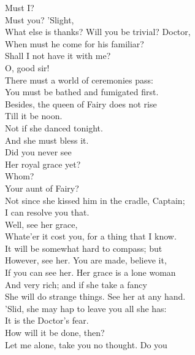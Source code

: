 \documentclass[a4paper,oneside,12pt]{memoir}
\begin{document}
\begin{drama*}
\dapperspeaks {} Must I?\\
\facespeaks {} Must you? 'Slight,\\
What else is thanks? Will you be trivial? Doctor,\\
When must he come for his familiar?\\
\dapperspeaks Shall I not have it with me?\\
\subtlespeaks {} O, good sir!\\
There must a world of ceremonies pass:\\
You must be bathed and fumigated first.\\
Besides, the queen of Fairy does not rise\\
Till it be noon.\\
\facespeaks {} Not if she danced tonight.\\
\subtlespeaks And she must bless it.\\
\facespeaks {} Did you never see\\
Her royal grace yet?\\
\dapperspeaks {} Whom?\\
\facespeaks {} Your aunt of Fairy?\\
\subtlespeaks Not since she kissed him in the cradle, Captain;\\
I can resolve you that.\\
\facespeaks {} Well, see her grace,\\
Whate'er it cost you, for a thing that I know.\\
It will be somewhat hard to compass; but\\
However, see her. You are made, believe it,\\
If you can see her. Her grace is a lone woman\\
And very rich; and if she take a fancy\\
She will do strange things. See her at any hand.\\
'Slid, she may hap to leave you all she has:\\
It is the Doctor's fear.\\
\dapperspeaks {} How will it be done, then?\\
\facespeaks Let me alone, take you no thought. Do you\\

\end{drama*}
\end{document}
